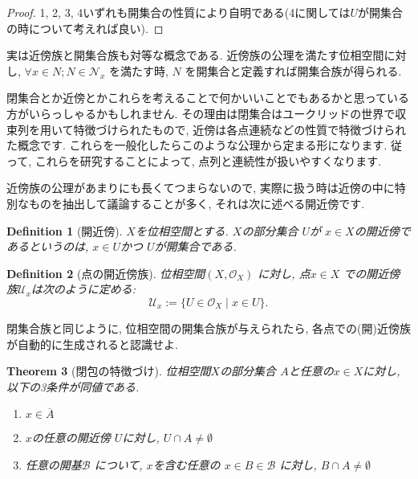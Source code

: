 \documentclass[lualatex]{ltjsbook}
\newcommand{\cl}[1]{\overline{ #1}  }
\newtheorem{theorem}{Theorem}[chapter]
\newtheorem{definition}[theorem]{Definition}
\theoremstyle{remark}
\theoremstyle{plain}
\begin{document}
\begin{proof}
	1, 2, 3, 4いずれも開集合の性質により自明である(4に関しては$U$が開集合の時について考えれば良い).
\end{proof}

実は近傍族と開集合族も対等な概念である. 近傍族の公理を満たす位相空間に対し,  $\forall x \in N; N \in \mathcal{N}_x$ を満たす時,  $N$ を開集合と定義すれば開集合族が得られる. 

閉集合とか近傍とかこれらを考えることで何かいいことでもあるかと思っている方がいらっしゃるかもしれません.
その理由は閉集合はユークリッドの世界で収束列を用いて特徴づけられたもので,  近傍は各点連続などの性質で特徴づけられた概念です.
これらを一般化したらこのような公理から定まる形になります. 従って,  これらを研究することによって,  点列と連続性が扱いやすくなります.

近傍族の公理があまりにも長くてつまらないので,  実際に扱う時は近傍の中に特別なものを抽出して議論することが多く,  それは次に述べる開近傍です.





\begin{definition}[開近傍]
	$X$を位相空間とする. $X$の部分集合 $U$が $x \in X$の開近傍であるというのは,   $ x \in U$かつ $U$が開集合である.
\end{definition}

\begin{definition}[点の開近傍族]
	位相空間$\left( X,  \mathcal{O}_X \right) $ に対し,  点$x \in X$ での開近傍族$\mathcal{U}_x$は次のように定める:
	\[
	\mathcal{U}_x := \{U \in \mathcal{O}_X \mid x \in U\} 
	.\] 
\end{definition}


閉集合族と同じように,  位相空間の開集合族が与えられたら,  各点での(開)近傍族が自動的に生成されると認識せよ.

\begin{theorem}[閉包の特徴づけ]
	位相空間$X$の部分集合 $A$と任意の$x \in X$に対し,  以下の3条件が同値である.
	 \begin{enumerate}
		\item $x \in \cl{A}$
		\item  $x$の任意の開近傍 $U$に対し,   $U\cap A \neq \emptyset$
		\item  任意の開基$\mathcal{B}$ について,  $x$を含む任意の $ x \in B \in \mathcal{B}$ に対し,  $B\cap A \neq \emptyset$
	\end{enumerate}
\end{theorem}
\end{document}

